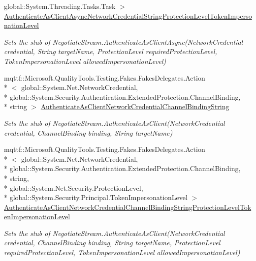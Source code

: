 \begin{DoxyCompactItemize}
global\-::\-System.\-Threading.\-Tasks.\-Task $>$ \hyperlink{class_system_1_1_net_1_1_security_1_1_fakes_1_1_stub_negotiate_stream_a3a6f034108b4644c9d9a468dff21638a}{Authenticate\-As\-Client\-Async\-Network\-Credential\-String\-Protection\-Level\-Token\-Impersonation\-Level}
\begin{DoxyCompactList}\small\item\em Sets the stub of Negotiate\-Stream.\-Authenticate\-As\-Client\-Async(\-Network\-Credential credential, String target\-Name, Protection\-Level required\-Protection\-Level, Token\-Impersonation\-Level allowed\-Impersonation\-Level)\end{DoxyCompactList}\item 
mqttf\-::\-Microsoft.\-Quality\-Tools.\-Testing.\-Fakes.\-Fakes\-Delegates.\-Action\\*
$<$ global\-::\-System.\-Net.\-Network\-Credential, \\*
global\-::\-System.\-Security.\-Authentication.\-Extended\-Protection.\-Channel\-Binding, \\*
string $>$ \hyperlink{class_system_1_1_net_1_1_security_1_1_fakes_1_1_stub_negotiate_stream_ab26db2409266ae7ca8f3534346bbc575}{Authenticate\-As\-Client\-Network\-Credential\-Channel\-Binding\-String}
\begin{DoxyCompactList}\small\item\em Sets the stub of Negotiate\-Stream.\-Authenticate\-As\-Client(\-Network\-Credential credential, Channel\-Binding binding, String target\-Name)\end{DoxyCompactList}\item 
mqttf\-::\-Microsoft.\-Quality\-Tools.\-Testing.\-Fakes.\-Fakes\-Delegates.\-Action\\*
$<$ global\-::\-System.\-Net.\-Network\-Credential, \\*
global\-::\-System.\-Security.\-Authentication.\-Extended\-Protection.\-Channel\-Binding, \\*
string, \\*
global\-::\-System.\-Net.\-Security.\-Protection\-Level, \\*
global\-::\-System.\-Security.\-Principal.\-Token\-Impersonation\-Level $>$ \hyperlink{class_system_1_1_net_1_1_security_1_1_fakes_1_1_stub_negotiate_stream_a8c673b3e156e152baeda812992f60bec}{Authenticate\-As\-Client\-Network\-Credential\-Channel\-Binding\-String\-Protection\-Level\-Token\-Impersonation\-Level}
\begin{DoxyCompactList}\small\item\em Sets the stub of Negotiate\-Stream.\-Authenticate\-As\-Client(\-Network\-Credential credential, Channel\-Binding binding, String target\-Name, Protection\-Level required\-Protection\-Level, Token\-Impersonation\-Level allowed\-Impersonation\-Level)\end{DoxyCompactList}\item 

\end{DoxyCompactItemize}
